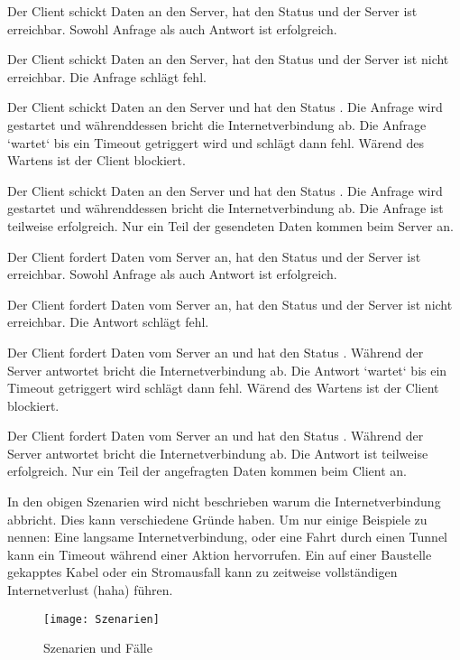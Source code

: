 \begin{description}[leftmargin=0.7cm,style=nextline]
\item[Szenario A0:]
Der Client schickt Daten an den Server, hat den Status  und der Server ist erreichbar. Sowohl Anfrage als auch Antwort ist erfolgreich.\\
\item[Szenario A1:]
Der Client schickt Daten an den Server, hat den Status  und der Server ist nicht erreichbar. Die Anfrage schlägt fehl.\\
\item[Szenario A2:]
Der Client schickt Daten an den Server und hat den Status . Die Anfrage wird gestartet und währenddessen bricht die Internetverbindung ab. Die Anfrage `wartet` bis ein Timeout getriggert wird und schlägt dann fehl. Wärend des Wartens ist der Client blockiert.\\
\item[Szenario A3:]
Der Client schickt Daten an den Server und hat den Status . Die Anfrage wird gestartet und währenddessen bricht die Internetverbindung ab. Die Anfrage ist teilweise erfolgreich. Nur ein Teil der gesendeten Daten kommen beim Server an.\\
\item[Szenario S0:]
Der Client fordert Daten vom Server an, hat den Status  und der Server ist erreichbar. Sowohl Anfrage als auch Antwort ist erfolgreich.\\
\item[Szenario S1:]
Der Client fordert Daten vom Server an, hat den Status  und der Server ist nicht erreichbar. Die Antwort schlägt fehl.\\
\item[Szenario S2:]
Der Client fordert Daten vom Server an und hat den Status . Während der Server antwortet bricht die Internetverbindung ab. Die Antwort `wartet` bis ein Timeout getriggert wird schlägt dann fehl. Wärend des Wartens ist der Client blockiert.\\
\item[Szenario S3:]
Der Client fordert Daten vom Server an und hat den Status . Während der Server antwortet bricht die Internetverbindung ab. Die Antwort ist teilweise erfolgreich. Nur ein Teil der angefragten Daten kommen beim Client an.
\end{description}
In den obigen Szenarien wird nicht beschrieben warum die Internetverbindung abbricht. Dies kann verschiedene Gründe haben. Um nur einige Beispiele zu nennen: Eine langsame Internetverbindung, oder eine Fahrt durch einen Tunnel kann ein Timeout während einer Aktion hervorrufen. Ein auf einer Baustelle gekapptes Kabel oder ein Stromausfall kann zu zeitweise vollständigen Internetverlust (haha) führen.
\begin{figure}[H]
  \centering
  \texttt{[image: Szenarien]}
  \grayRule
  \caption[Szenarien]{Szenarien und Fälle}
  \label{fig:scenarios}
\end{figure}
%
%
